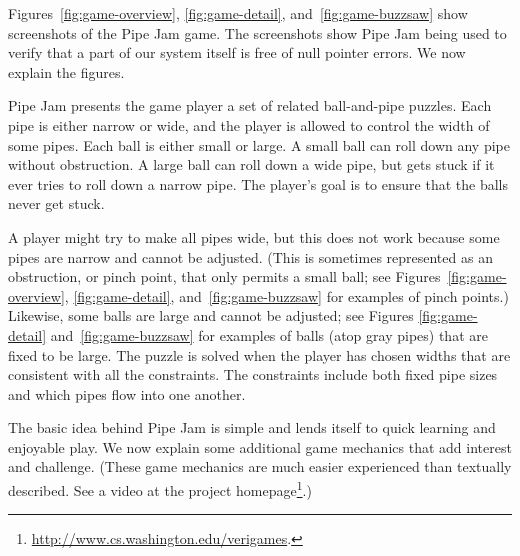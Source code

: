 \documentclass{sig-alternate}
\begin{document}
Figures~\ref{fig:game-overview}, \ref{fig:game-detail},
and~\ref{fig:game-buzzsaw} show screenshots of the Pipe Jam game.  The
screenshots show Pipe Jam being used to verify that a part of our system
itself is free of null pointer errors.  We now explain the figures.

Pipe Jam presents the game player a set of related ball-and-pipe
puzzles.  Each pipe is either narrow or wide, and the player is
allowed to control the width of some pipes.  Each ball is either small
or large.  A small ball can roll down any pipe without obstruction.  A
large ball can roll down a wide pipe, but gets stuck if it ever tries
to roll down a narrow pipe.  The player's goal is to ensure that the
balls never get stuck.

A player might try to make all pipes wide, but this does not work
because some pipes are narrow and cannot be adjusted.  (This is
sometimes represented as an obstruction, or pinch point, that only
permits a small ball; see Figures~\ref{fig:game-overview},
\ref{fig:game-detail}, and~\ref{fig:game-buzzsaw} for examples of
pinch points.)  Likewise, some balls are large and cannot be adjusted;
see Figures \ref{fig:game-detail} and~\ref{fig:game-buzzsaw} for
examples of balls (atop gray pipes) that are fixed to be large.  The
puzzle is solved when the player has chosen widths that are consistent
with all the constraints.  The constraints include both fixed pipe sizes
and which pipes
flow into one another.

The basic idea behind Pipe Jam is simple and lends itself to quick
learning and enjoyable play.  We now explain some additional game
mechanics that add interest and challenge.  (These game mechanics are
much easier experienced than textually described. See a video at the
project homepage\footnote{\url{http://www.cs.washington.edu/verigames}.}.)
\end{document}
